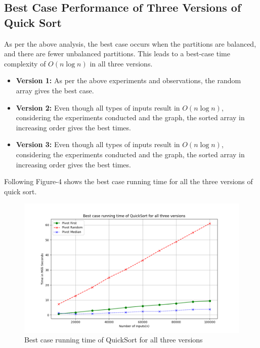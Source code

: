 \documentclass[a4paper,12pt]{report}
\begin{document}
\subsection{Best Case Performance of Three Versions of Quick Sort}
As per the above analysis, the best case occurs when the partitions are balanced, and there are fewer unbalanced partitions. This leads to a best-case time complexity of \(O(n \log n)\) in all three versions.
\begin{itemize}
    \item \textbf{Version 1:} As per the above experiments and observations, the random array gives the best case.

    \item \textbf{Version 2:} Even though all types of inputs result in \(O(n \log n)\), considering the experiments conducted and the graph, the sorted array in increasing order gives the best times.

    \item \textbf{Version 3:} Even though all types of inputs result in \(O(n \log n)\), considering the experiments conducted and the graph, the sorted array in increasing order gives the best times.
\end{itemize}
Following Figure-4 shows the best case running time for all the three versions of quick
sort.
\begin{figure}[H]
    \centering
    \includegraphics[width=1.1\textwidth]{./Best_case_QuickSort.png}
    \caption{Best case running time of QuickSort for all three versions}
    \label{fig:quicksort_median_pivot}
\end{figure}
\end{document}
